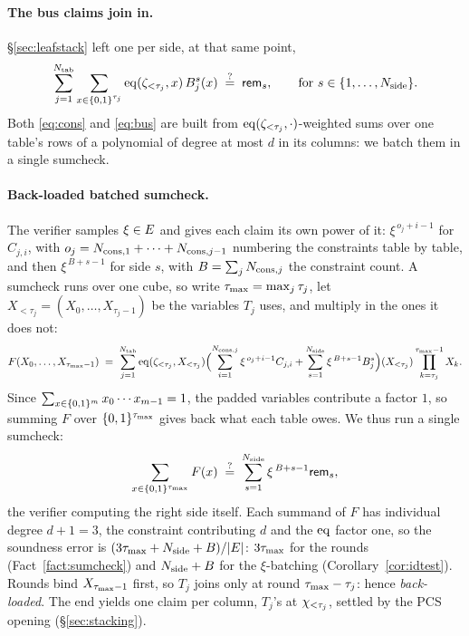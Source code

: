 \paragraph{The bus claims join in.} \S\ref{sec:leafstack} left one per side, at that same point,
\begin{equation}\label{eq:bus}
  \sum_{j=1}^{N_{\mathrm{tab}}}\sum_{x\in\{0,1\}^{\tau_j}}\operatorname{eq}(\zeta_{<\tau_j},x)\,B^{s}_j(x)\;\stackrel{?}{=}\;\mathsf{rem}_{s},
  \qquad \text{for } s\in\{1,\dots,N_{\mathrm{side}}\}.
\end{equation}
Both \eqref{eq:cons} and \eqref{eq:bus} are built from $\operatorname{eq}(\zeta_{<\tau_j},\cdot)$-weighted sums over one table's rows of a polynomial of degree at most $d$ in its columns: we batch them in a single sumcheck.

\paragraph{Back-loaded batched sumcheck.} The verifier samples $\xi\in E$ and gives each claim its own power of it: $\xi^{\,o_j+i-1}$ for $C_{j,i}$, with $o_j=N_{\mathrm{cons},1}+\dots+N_{\mathrm{cons},j-1}$ numbering the constraints table by table, and then $\xi^{\,B+s-1}$ for side $s$, with $B=\sum_jN_{\mathrm{cons},j}$ the constraint count. A sumcheck runs over one cube, so write $\tau_{\max}=\max_j\tau_j$, let $X_{<\tau_j}=(X_0,\dots,X_{\tau_j-1})$ be the variables $T_j$ uses, and multiply in the ones it does not:
\[
  F(X_0,\dots,X_{\tau_{\max}-1})\;=\;\sum_{j=1}^{N_{\mathrm{tab}}}\operatorname{eq}(\zeta_{<\tau_j},X_{<\tau_j})
  \Bigl(\sum_{i=1}^{N_{\mathrm{cons},j}}\xi^{\,o_j+i-1}C_{j,i}+\sum_{s=1}^{N_{\mathrm{side}}}\xi^{\,B+s-1}B^{s}_j\Bigr)(X_{<\tau_j})
  \prod_{k=\tau_j}^{\tau_{\max}-1}X_k .
\]
Since $\sum_{x\in\{0,1\}^{m}}x_0\cdots x_{m-1}=1$, the padded variables contribute a factor $1$, so summing $F$ over $\{0,1\}^{\tau_{\max}}$ gives back what each table owes. We thus run a single sumcheck:
\[
  \sum_{x\in\{0,1\}^{\tau_{\max}}}F(x)\;\stackrel{?}{=}\;\sum_{s=1}^{N_{\mathrm{side}}}\xi^{\,B+s-1}\mathsf{rem}_{s},
\]
the verifier computing the right side itself. Each summand of $F$ has individual degree $d+1=3$, the constraint contributing $d$ and the $\operatorname{eq}$ factor one, so the soundness error is $(3\tau_{\max}+N_{\mathrm{side}}+B)/|E|$: $3\tau_{\max}$ for the rounds (Fact~\ref{fact:sumcheck}) and $N_{\mathrm{side}}+B$ for the $\xi$-batching (Corollary~\ref{cor:idtest}). Rounds bind $X_{\tau_{\max}-1}$ first, so $T_j$ joins only at round $\tau_{\max}-\tau_j$: hence \emph{back-loaded}. The end yields one claim per column, $T_j$'s at $\chi_{<\tau_j}$, settled by the PCS opening (\S\ref{sec:stacking}).
